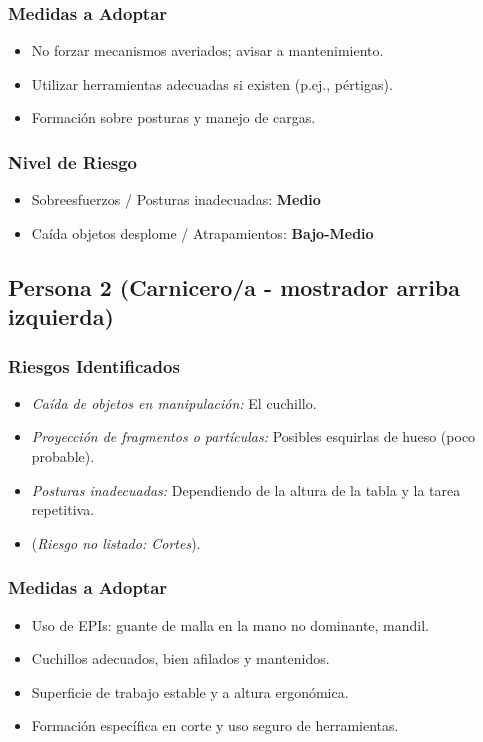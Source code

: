 \documentclass[12pt,a4paper]{article}
\begin{document}
	\subsubsection{Medidas a Adoptar}
	\begin{itemize}
		\item No forzar mecanismos averiados; avisar a mantenimiento.
		\item Utilizar herramientas adecuadas si existen (p.ej., pértigas).
		\item Formación sobre posturas y manejo de cargas.
	\end{itemize}
	
	\subsubsection{Nivel de Riesgo}
	\begin{itemize}
		\item Sobreesfuerzos / Posturas inadecuadas: \textbf{Medio}
		\item Caída objetos desplome / Atrapamientos: \textbf{Bajo-Medio}
	\end{itemize}
	
	\bigskip\hrulefill\bigskip
	
	\subsection{Persona 2 (Carnicero/a - mostrador arriba izquierda)}
	
	\subsubsection{Riesgos Identificados}
	\begin{itemize}
		\item \textit{Caída de objetos en manipulación:} El cuchillo.
		\item \textit{Proyección de fragmentos o partículas:} Posibles esquirlas de hueso (poco probable).
		\item \textit{Posturas inadecuadas:} Dependiendo de la altura de la tabla y la tarea repetitiva.
		\item (\textit{Riesgo no listado: Cortes}).
	\end{itemize}
	
	\subsubsection{Medidas a Adoptar}
	\begin{itemize}
		\item Uso de EPIs: guante de malla en la mano no dominante, mandil.
		\item Cuchillos adecuados, bien afilados y mantenidos.
		\item Superficie de trabajo estable y a altura ergonómica.
		\item Formación específica en corte y uso seguro de herramientas.
	\end{itemize}
	
\end{document}
